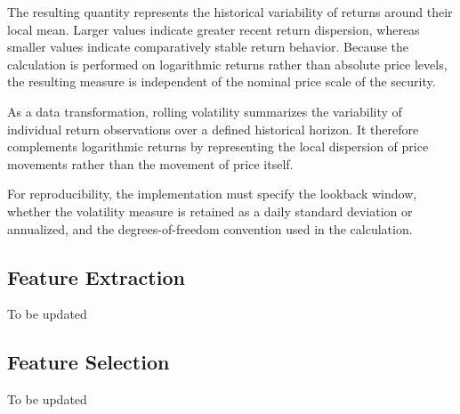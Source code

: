 The resulting quantity represents the historical variability of returns around their local mean. Larger values indicate greater recent return dispersion, whereas smaller values indicate comparatively stable return behavior. Because the calculation is performed on logarithmic returns rather than absolute price levels, the resulting measure is independent of the nominal price scale of the security.

\medskip

As a data transformation, rolling volatility summarizes the variability of individual return observations over a defined historical horizon. It therefore complements logarithmic returns by representing the local dispersion of price movements rather than the movement of price itself.

\medskip

For reproducibility, the implementation must specify the lookback window, whether the volatility measure is retained as a daily standard deviation or annualized, and the degrees-of-freedom convention used in the calculation.

\subsection{Feature Extraction}
To be updated

\subsection{Feature Selection}
To be updated